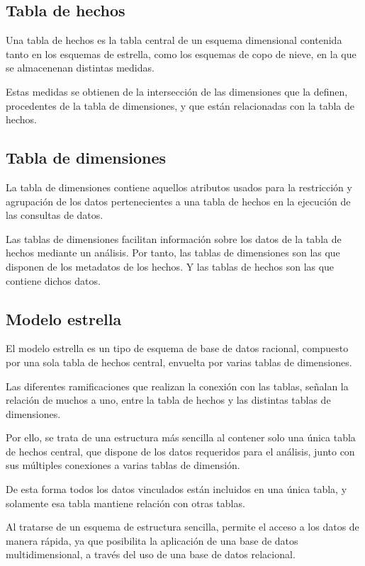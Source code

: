 \subsection{Tabla de hechos}
Una tabla de hechos \cite{tabla_hechos} es la tabla central de un esquema dimensional contenida tanto en los esquemas de estrella, como los esquemas de copo de nieve, en la que se almacenenan distintas medidas.

Estas medidas se obtienen de la intersección de las dimensiones que la definen, procedentes de la tabla de dimensiones, y que están relacionadas con la tabla de hechos.

\subsection{Tabla de dimensiones}
La tabla de dimensiones \cite{tabla_dimensiones} contiene aquellos atributos usados para la restricción y agrupación de los datos pertenecientes a una tabla de hechos en la ejecución de las consultas de datos.

Las tablas de dimensiones facilitan información sobre los datos de la tabla de hechos mediante un análisis. Por tanto, las tablas de dimensiones son las que disponen de los metadatos de los hechos. Y las tablas de hechos son las que contiene dichos datos.
\subsection{Modelo estrella}
El modelo estrella \cite{Estrella} es un tipo de esquema de base de datos racional, compuesto por una sola tabla de hechos central, envuelta por varias tablas de dimensiones.

Las diferentes ramificaciones que realizan la conexión con las tablas, señalan la relación de muchos a uno, entre la tabla de hechos y las distintas tablas de dimensiones.

Por ello, se trata de una estructura más sencilla al contener solo una única tabla de hechos central, que dispone de los datos requeridos para el análisis, junto con sus múltiples conexiones a varias tablas de dimensión. 

De esta forma todos los datos vinculados están incluidos en una única tabla, y solamente esa tabla mantiene relación con otras tablas.


Al tratarse de un esquema de estructura sencilla, permite el acceso a los datos de manera rápida, ya que posibilita la aplicación de una base de datos multidimensional, a través del uso de una base de datos relacional.

